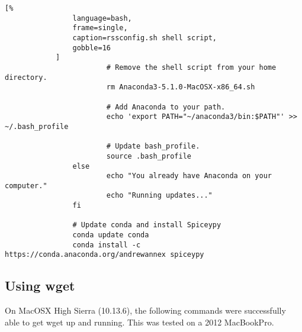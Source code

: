 \documentclass[crop=false,class=article,oneside]{standalone}
\begin{document}
\begin{lstlisting}[%
                language=bash,
                frame=single,
                caption=rssconfig.sh shell script,
                gobble=16
            ]
                        # Remove the shell script from your home directory.
                        rm Anaconda3-5.1.0-MacOSX-x86_64.sh
                
                        # Add Anaconda to your path.
                        echo 'export PATH="~/anaconda3/bin:$PATH"' >> ~/.bash_profile
                
                        # Update bash_profile.
                        source .bash_profile
                else
                        echo "You already have Anaconda on your computer."
                        echo "Running updates..."
                fi
                
                # Update conda and install Spiceypy
                conda update conda
                conda install -c https://conda.anaconda.org/andrewannex spiceypy
            \end{lstlisting}
        \subsection{Using wget}
            On MacOSX High Sierra (10.13.6), the following commands
            were successfully able to get wget up and running.
            This was tested on a 2012 MacBookPro.
\end{document}
